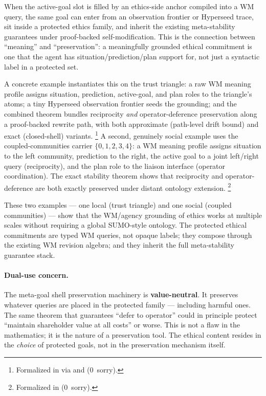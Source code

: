 \documentclass[11pt,openany]{report}
\begin{document}
\noindent
When the active-goal slot is filled by an ethics-side anchor compiled into a
WM query, the same goal can enter from an observation frontier or Hyperseed
trace, sit inside a protected ethics family, and inherit the existing
meta-stability guarantees under proof-backed self-modification.
This is the connection between ``meaning'' and ``preservation'': a
meaningfully grounded ethical commitment is one that the agent has
situation/prediction/plan support for, not just a syntactic label in a
protected set.

A concrete example instantiates this on the trust triangle: a raw WM
meaning profile assigns situation, prediction, active-goal, and plan roles to
the triangle's atoms; a tiny Hyperseed observation frontier seeds the
grounding; and the combined theorem bundles reciprocity \emph{and}
operator-deference preservation along a proof-backed rewrite path, with both
approximate (path-level drift bound) and exact (closed-shell) variants.%
\footnote{Formalized in
via  and
(0~sorry).}
A second, genuinely social example uses the coupled-communities carrier
$\{0,1,2,3,4\}$: a WM meaning profile assigns situation to the left
community, prediction to the right, the active goal to a joint left/right
query (reciprocity), and the plan role to the liaison interface (operator
coordination).  The exact stability theorem shows that reciprocity and
operator-deference are both exactly preserved under distant ontology
extension.%
\footnote{Formalized in
(0~sorry).}

\noindent
These two examples --- one local (trust triangle) and one social
(coupled communities) --- show that the WM/agency grounding of ethics
works at multiple scales without requiring a global SUMO-style ontology.
The protected ethical commitments are typed WM queries, not opaque labels;
they compose through the existing WM revision algebra; and they inherit the
full meta-stability guarantee stack.

\paragraph{Dual-use concern.}

The meta-goal shell preservation machinery is \textbf{value-neutral}.  It
preserves whatever queries are placed in the protected family --- including
harmful ones.  The same theorem that guarantees ``defer to operator'' could
in principle protect ``maintain shareholder value at all costs'' or worse.
This is not a flaw in the mathematics; it is the nature of a preservation
tool.  The ethical content resides in the \emph{choice} of protected goals,
not in the preservation mechanism itself.
\end{document}
